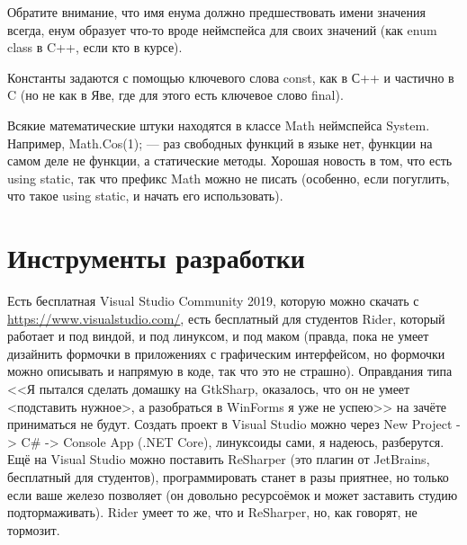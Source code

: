 \documentclass[a5paper]{article}
\begin{document}
Обратите внимание, что имя енума должно предшествовать имени значения всегда, енум образует что-то вроде неймспейса для своих значений (как enum class в C++, если кто в курсе).

Константы задаются с помощью ключевого слова const, как в С++ и частично в C (но не как в Яве, где для этого есть ключевое слово final).

Всякие математические штуки находятся в классе Math неймспейса System. Например, Math.Cos(1); --- раз свободных функций в языке нет, функции на самом деле не функции, а статические методы. Хорошая новость в том, что есть using static, так что префикс Math можно не писать (особенно, если погуглить, что такое using static, и начать его использовать).

\section{Инструменты разработки}

Есть бесплатная Visual Studio Community 2019, которую можно скачать с \url{https://www.visualstudio.com/}, есть бесплатный для студентов Rider, который работает и под виндой, и под линуксом, и под маком (правда, пока не умеет дизайнить формочки в приложениях с графическим интерфейсом, но формочки можно описывать и напрямую в коде, так что это не страшно). Оправдания типа <<Я пытался сделать домашку на GtkSharp, оказалось, что он не умеет <подставить нужное>, а разобраться в WinForms я уже не успею>> на зачёте приниматься не будут. Создать проект в Visual Studio можно через New Project -> C\# -> Console App (.NET Core), линуксоиды сами, я надеюсь, разберутся. Ещё на Visual Studio можно поставить ReSharper (это плагин от JetBrains, бесплатный для студентов), программировать станет в разы приятнее, но только если ваше железо позволяет (он довольно ресурсоёмок и может заставить студию подтормаживать). Rider умеет то же, что и ReSharper, но, как говорят, не тормозит.
\end{document}
